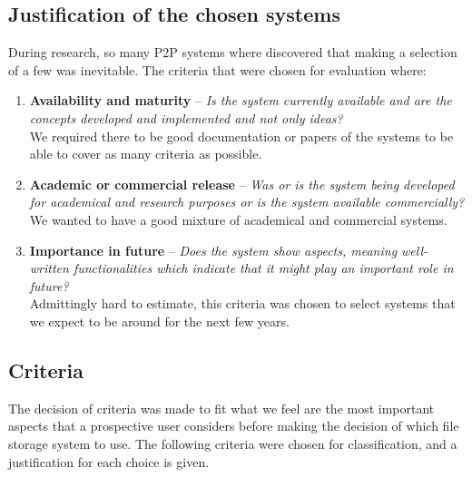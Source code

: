 \subsection{Justification of the chosen systems}
During research, so many P2P systems where discovered that making a selection of a few was inevitable. The criteria that were chosen for evaluation where:
\begin{enumerate}
\item \textbf{Availability and maturity} -- \textit{Is the system currently available and are the concepts developed and implemented and not only ideas?}\\
We required there to be good documentation or papers of the systems to be able to cover as many criteria as possible.

\item \textbf{Academic or commercial release} -- \textit{Was or is the system being developed for academical and research purposes or is the system available commercially?}\\
We wanted to have a good mixture of academical and commercial systems.

\item \textbf{Importance in future} -- \textit{Does the system show aspects, meaning well-written functionalities which indicate that it might play an important role in future?}\\
Admittingly hard to estimate, this criteria was chosen to select systems that we expect to be around for the next few years.
\end{enumerate}

\subsection{Criteria}
The decision of criteria was made to fit what we feel are the most important aspects that a prospective user considers before making the decision of which file storage system to use. The following criteria were chosen for classification, and a justification for each choice is given.

